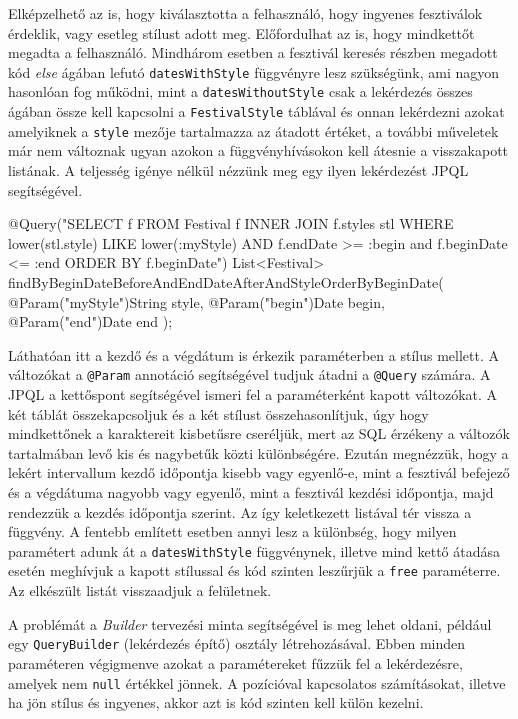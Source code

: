 Elképzelhető az is, hogy kiválasztotta a felhasználó, hogy ingyenes fesztiválok érdeklik, vagy esetleg stílust adott meg. Előfordulhat az is, hogy mindkettőt megadta a felhasználó. Mindhárom esetben a fesztivál keresés részben megadott kód \textit{else} ágában lefutó \texttt{datesWithStyle} függvényre lesz szükségünk, ami nagyon hasonlóan fog működni, mint a \texttt{datesWithoutStyle} csak a lekérdezés összes ágában össze kell kapcsolni a \texttt{FestivalStyle} táblával és onnan lekérdezni azokat amelyiknek a \texttt{style} mezője tartalmazza az átadott értéket, a további műveletek már nem változnak ugyan azokon a függvényhívásokon kell átesnie a visszakapott listának. A teljesség igénye nélkül nézzünk meg egy ilyen lekérdezést JPQL segítségével.

\begin{java}
@Query("SELECT f FROM Festival f INNER JOIN f.styles stl WHERE 
lower(stl.style) LIKE lower(:myStyle) AND f.endDate >= :begin
and f.beginDate <= :end ORDER BY f.beginDate")
List<Festival> 
findByBeginDateBeforeAndEndDateAfterAndStyleOrderByBeginDate(
    @Param("myStyle")String style,
    @Param("begin")Date begin, 
    @Param("end")Date end
);
\end{java}

Láthatóan itt a kezdő és a végdátum is érkezik paraméterben a stílus mellett. A változókat a \texttt{@Param} annotáció segítségével tudjuk átadni a \texttt{@Query} számára. A JPQL a kettőspont segítségével ismeri fel a paraméterként kapott változókat. A két táblát összekapcsoljuk és a két stílust összehasonlítjuk, úgy hogy mindkettőnek a karaktereit kisbetűsre cseréljük, mert az SQL érzékeny a változók tartalmában levő kis és nagybetűk közti különbségére. Ezután megnézzük, hogy a lekért intervallum kezdő időpontja kisebb vagy egyenlő-e, mint a fesztivál befejező és a végdátuma nagyobb vagy egyenlő, mint a fesztivál kezdési időpontja, majd rendezzük a kezdés időpontja szerint. Az így keletkezett listával tér vissza a függvény. A fentebb említett esetben annyi lesz a különbség, hogy milyen paramétert adunk át a \texttt{datesWithStyle} függvénynek, illetve mind kettő átadása esetén meghívjuk a kapott stílussal és kód szinten leszűrjük a \texttt{free} paraméterre. Az elkészült listát visszaadjuk a felületnek.

A problémát a \textit{Builder} tervezési minta segítségével is meg lehet oldani, például egy \texttt{QueryBuilder} (lekérdezés építő) osztály létrehozásával. Ebben minden paraméteren végigmenve azokat a paramétereket fűzzük fel a lekérdezésre, amelyek nem \texttt{null} értékkel jönnek. A pozícióval kapcsolatos számításokat, illetve ha jön stílus és ingyenes, akkor azt is kód szinten kell külön kezelni.


